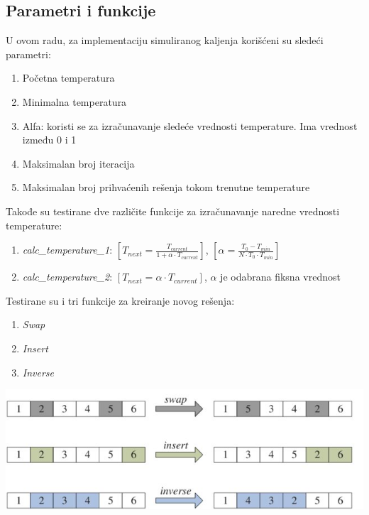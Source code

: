 \documentclass[12pt, a4paper]{article}
\begin{document}
\subsection{Parametri i funkcije}
U ovom radu, za implementaciju simuliranog kaljenja korišćeni su sledeći parametri:
\begin{enumerate}
	\item Početna temperatura
	\item Minimalna temperatura
	\item Alfa: koristi se za izračunavanje sledeće vrednosti temperature. Ima vrednost između 0 i 1
	\item Maksimalan broj iteracija
	\item Maksimalan broj prihvaćenih rešenja tokom trenutne temperature \\
\end{enumerate}

Takođe su testirane dve različite funkcije za izračunavanje naredne vrednosti temperature:
\begin{enumerate}
	\item \textit{calc\_temperature\_1}:  $[  T_{next} = \frac{T_{current}}{1 + \alpha \cdot T_{current}} ]$, $[\alpha = \frac{T_0 - T_{min}}{N \cdot T_0 \cdot T_{min}}]$

	\item \textit{calc\_temperature\_2}: $[T_{next} = \alpha \cdot T_{current} ]$, $ \alpha$ je odabrana fiksna vrednost
\end{enumerate}

Testirane su i tri funkcije za kreiranje novog rešenja:
\begin{enumerate}
	\item \textit{Swap}
	\item \textit{Insert}
	\item \textit{Inverse} 
\end{enumerate}


\vspace{0.5cm}
\begin{center}
  \hspace{1cm}
  \includegraphics[width=0.8\linewidth]{img/make_sc_funs.jpg}
  \hspace{1cm} 
\end{center}
\vspace{0.5cm}
\end{document}
